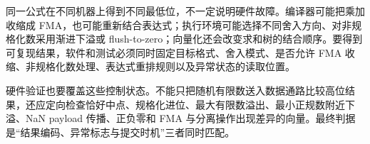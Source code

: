 
同一公式在不同机器上得到不同最低位，不一定说明硬件故障。编译器可能把乘加收缩成 FMA，也可能重新结合表达式；执行环境可能选择不同舍入方向、对非规格化数采用渐进下溢或 flush-to-zero；向量化还会改变求和树的结合顺序。要得到可复现结果，软件和测试必须同时固定目标格式、舍入模式、是否允许 FMA 收缩、非规格化数处理、表达式重排规则以及异常状态的读取位置。

硬件验证也要覆盖这些控制状态。不能只把随机有限数送入数据通路比较高位结果，还应定向检查恰好中点、规格化进位、最大有限数溢出、最小正规数附近下溢、NaN payload 传播、正负零和 FMA 与分离操作出现差异的向量。最终判据是“结果编码、异常标志与提交时机”三者同时匹配。
